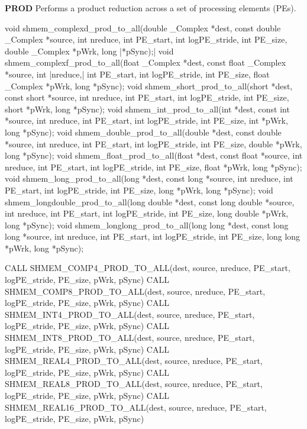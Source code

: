 \begin{apidefinition}
\bigskip
\textbf{PROD} \newline
Performs a product reduction across a set of processing elements (\acp{PE}).\newline
\begin{Csynopsis}
void shmem_complexd_prod_to_all(double _Complex *dest, const double _Complex *source, int nreduce, int PE_start, int logPE_stride, int PE_size, double _Complex *pWrk, long |\mbox{*pSync);}|
void shmem_complexf_prod_to_all(float _Complex *dest, const float _Complex *source, int |\mbox{nreduce,}| int PE_start, int logPE_stride, int PE_size, float _Complex *pWrk, long *pSync);
void shmem_short_prod_to_all(short *dest, const short *source, int nreduce, int PE_start, int logPE_stride, int PE_size, short *pWrk, long *pSync);
void shmem_int_prod_to_all(int *dest, const int *source, int nreduce, int PE_start, int logPE_stride, int PE_size, int *pWrk, long *pSync);
void shmem_double_prod_to_all(double *dest, const double *source, int nreduce, int PE_start, int logPE_stride, int PE_size, double *pWrk, long *pSync);
void shmem_float_prod_to_all(float *dest, const float *source, int nreduce, int PE_start, int logPE_stride, int PE_size, float *pWrk, long *pSync);
void shmem_long_prod_to_all(long *dest, const long *source, int nreduce, int PE_start, int logPE_stride, int PE_size, long *pWrk, long *pSync);
void shmem_longdouble_prod_to_all(long double *dest, const long double *source, int nreduce, int PE_start, int logPE_stride, int PE_size, long double *pWrk, long *pSync);
void shmem_longlong_prod_to_all(long long *dest, const long long *source, int nreduce, int PE_start, int logPE_stride, int PE_size, long long *pWrk, long *pSync);
\end{Csynopsis}

\begin{Fsynopsis}
CALL SHMEM_COMP4_PROD_TO_ALL(dest, source, nreduce, PE_start, logPE_stride, PE_size, pWrk, pSync)
CALL SHMEM_COMP8_PROD_TO_ALL(dest, source, nreduce, PE_start, logPE_stride, PE_size, pWrk, pSync)
CALL SHMEM_INT4_PROD_TO_ALL(dest, source, nreduce, PE_start, logPE_stride, PE_size, pWrk, pSync)
CALL SHMEM_INT8_PROD_TO_ALL(dest, source, nreduce, PE_start, logPE_stride, PE_size, pWrk, pSync)
CALL SHMEM_REAL4_PROD_TO_ALL(dest, source, nreduce, PE_start, logPE_stride, PE_size, pWrk, pSync)
CALL SHMEM_REAL8_PROD_TO_ALL(dest, source, nreduce, PE_start, logPE_stride, PE_size, pWrk, pSync)
CALL SHMEM_REAL16_PROD_TO_ALL(dest, source, nreduce, PE_start, logPE_stride, PE_size, pWrk, pSync)
\end{Fsynopsis}


\end{apidefinition}
